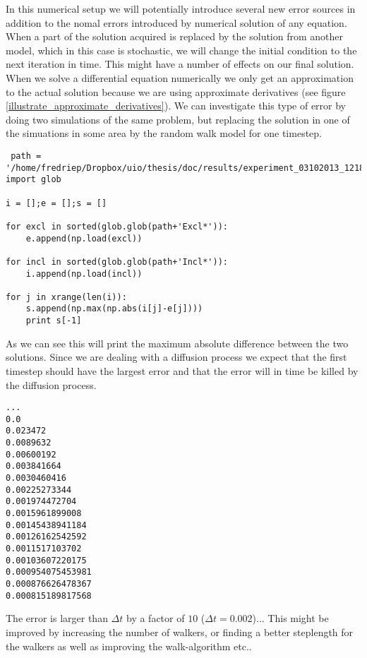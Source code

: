 In this numerical setup we will potentially introduce several new error sources in addition to the nomal errors introduced by numerical solution of any equation. 
When a part of the solution acquired is replaced by the solution from another model, which in this case is stochastic, we will change the initial condition to the next iteration in time. 
This might have a number of effects on our final solution. 
When we solve a differential equation numerically we only get an approximation to the actual solution because we are using approximate derivatives (see figure \ref{illustrate_approximate_derivatives}). 
We can investigate this type of error by doing two simulations of the same problem, but replacing the solution in one of the simuations in some area by the random walk model for one timestep. 

\begin{lstlisting}
 path = '/home/fredriep/Dropbox/uio/thesis/doc/results/experiment_03102013_1218/results/'
import glob

i = [];e = [];s = []

for excl in sorted(glob.glob(path+'Excl*')):
	e.append(np.load(excl))

for incl in sorted(glob.glob(path+'Incl*')):
	i.append(np.load(incl))

for j in xrange(len(i)):
	s.append(np.max(np.abs(i[j]-e[j])))
	print s[-1]
\end{lstlisting}
As we can see this will print the maximum absolute difference between the two solutions. 
Since we are dealing with a diffusion process we expect that the first timestep should have the largest error and that the error will in time be killed by the diffusion process. 
\begin{lstlisting}
...
0.0
0.023472
0.0089632
0.00600192
0.003841664
0.0030460416
0.00225273344
0.001974472704
0.0015961899008
0.00145438941184
0.00126162542592
0.0011517103702
0.00103607220175
0.000954075453981
0.000876626478367
0.000815189817568
\end{lstlisting}
The error is larger than $\Delta t$ by a factor of $10$ ($\Delta t = 0.002$)... 
This might be improved by increasing the number of walkers, or finding a better steplength for the walkers as well as improving the walk-algorithm etc..